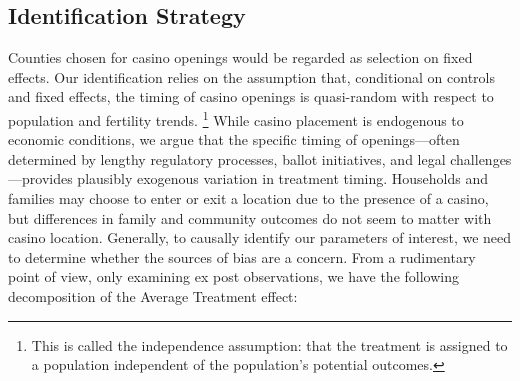 \documentclass[12pt]{article}
\begin{document}











\subsection{Identification Strategy}

Counties chosen for casino openings would be regarded as selection on fixed effects. Our identification relies on the assumption that, conditional on controls and fixed effects, the timing of casino openings is quasi-random with respect to population and fertility trends. \footnote{This is called the independence assumption: that the treatment is assigned to a population independent of the population's potential outcomes.} While casino placement is endogenous to economic conditions, we argue that the specific timing of openings—often determined by lengthy regulatory processes, ballot initiatives, and legal challenges—provides plausibly exogenous variation in treatment timing. Households and families may choose to enter or exit a location due to the presence of a casino, but differences in family and community outcomes do not seem to matter with casino location. 
Generally, to causally identify our parameters of interest, we need to determine whether the sources of bias are a concern. From a rudimentary point of view, only examining ex post observations, we have the following decomposition of the Average Treatment effect:
\end{document}
